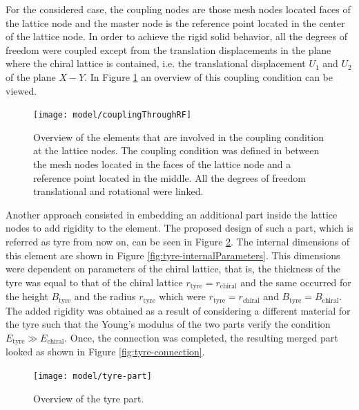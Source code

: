     For the considered case, the coupling nodes are those mesh nodes located faces of the lattice node and the master node is the reference point located in the center of the lattice node. In order to achieve the rigid solid behavior, all the degrees of freedom were coupled except from the translation displacements in the plane where the chiral lattice is contained, i.e. the translational displacement $U_1$ and $U_2$ of the plane $X-Y$. In Figure \ref{fig:couplingThroughRF} an overview of this coupling condition can be viewed.

    \begin{figure}[!htpb]
      \centering
      \texttt{[image: model/couplingThroughRF]}
      \caption[Overview of the elements that are involved in the coupling condition at the lattice nodes]{Overview of the elements that are involved in the coupling condition at the lattice nodes. The coupling condition was defined in between the mesh nodes located in the faces of the lattice node and a reference point located in the middle. All the degrees of freedom translational and rotational were linked.}\label{fig:couplingThroughRF}
    \end{figure}

    \clearpage
    Another approach consisted in embedding an additional part inside the lattice nodes to add rigidity to the element. The proposed design of such a part, which is referred as tyre from now on, can be seen in Figure \ref{fig:tyre-part}. The internal dimensions of this element are shown in Figure \ref{fig:tyre-internalParameters}. This dimensions were dependent on parameters of the chiral lattice, that is, the thickness of the tyre was equal to that of the chiral lattice $r_{\mathrm{tyre}} = r_{\mathrm{chiral}}$ and the same occurred for the height $B_{\mathrm{tyre}}$ and the radius $r_{\mathrm{tyre}}$ which were $r_{\mathrm{tyre}} = r_{\mathrm{chiral}}$ and $B_{\mathrm{tyre}} = B_{\mathrm{chiral}}$. The added rigidity was obtained as a result of considering a different material for the tyre such that the Young's modulus of the two parts verify the condition $E_{\mathrm{tyre}} \gg E_{\mathrm{chiral}}$. Once, the connection was completed, the resulting merged part looked as shown in Figure \ref{fig:tyre-connection}.

    \begin{figure}[!htpb]
      \centering
      \texttt{[image: model/tyre-part]}
      \caption[Overview of the tyre part]{Overview of the tyre part.}\label{fig:tyre-part}
    \end{figure}

